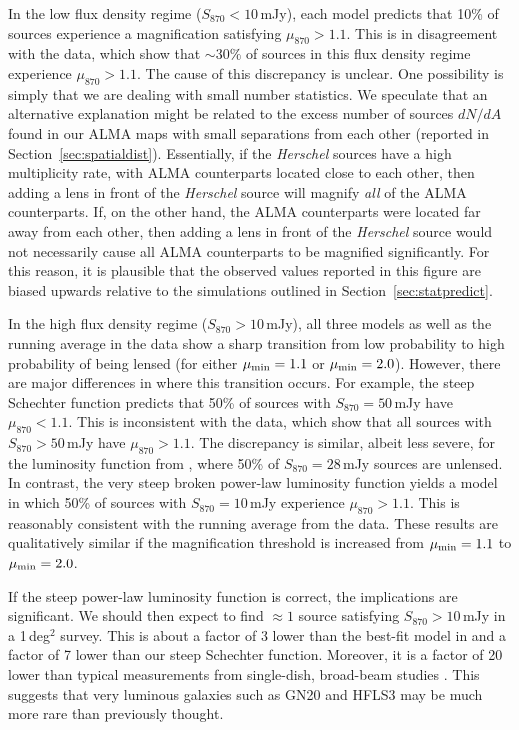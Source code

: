 \documentclass[iop]{emulateapj}
\begin{document}
In the low flux density regime ($S_{870} < 10\,$mJy), each model predicts that
10\% of sources experience a magnification satisfying $\mu_{870} > 1.1$.  This
is in disagreement with the data, which show that $\sim 30\%$ of sources in
this flux density regime experience $\mu_{870} > 1.1$.  The cause of this
discrepancy is unclear.  One possibility is simply that we are dealing with
small number statistics.  We speculate that an alternative explanation might be
related to the excess number of sources $dN/dA$ found in our ALMA maps with
small separations from each other (reported in Section~\ref{sec:spatialdist}).
Essentially, if the {\it Herschel} sources have a high multiplicity rate, with
ALMA counterparts located close to each other, then adding a lens in front of
the {\it Herschel} source will magnify {\it all} of the ALMA counterparts.  If,
on the other hand, the ALMA counterparts were located far away from each other,
then adding a lens in front of the {\it Herschel} source would not necessarily
cause all ALMA counterparts to be magnified significantly.  For this reason, it
is plausible that the observed values reported in this figure are biased
upwards relative to the simulations outlined in Section~\ref{sec:statpredict}.

In the high flux density regime ($S_{870} > 10\,$mJy), all
three models as well as the running average in the data show a sharp transition
from low probability to high probability of being lensed (for either $\mu_{\rm
min} = 1.1$ or $\mu_{\rm min} = 2.0$).  However, there are major differences in
where this transition occurs.  For example, the steep Schechter function
predicts that 50\% of sources with $S_{870} = 50\,$mJy have $\mu_{870} < 1.1$.
This is inconsistent with the data, which show that all sources with $S_{870} >
50\,$mJy have $\mu_{870} > 1.1$.  The discrepancy is similar, albeit less
severe, for the luminosity function from \citet{Karim:2013lr}, where 50\% of
$S_{870} = 28\,$mJy sources are unlensed.  In contrast, the very steep broken
power-law luminosity function yields a model in which 50\% of sources with
$S_{870} = 10\,$mJy experience $\mu_{870} > 1.1$.  This is reasonably
consistent with the running average from the data.  These results are
qualitatively similar if the magnification threshold is increased from
$\mu_{\rm min} = 1.1$ to $\mu_{\rm min} = 2.0$.

If the steep power-law luminosity function is correct, the implications are
significant.  We should then expect to find $\approx 1$ source satisfying
$S_{870} > 10\,$mJy in a 1$\,$deg$^2$ survey.  This is about a factor of 3
lower than the best-fit model in \citet{Karim:2013lr} and a factor of 7 lower
than our steep Schechter function.  Moreover, it is a factor of 20 lower than
typical measurements from single-dish, broad-beam studies
\citep[e.g.,][]{Weis:2009ly}.  This suggests that very luminous galaxies such as
GN20 and HFLS3 may be much more rare than previously thought.
\end{document}
